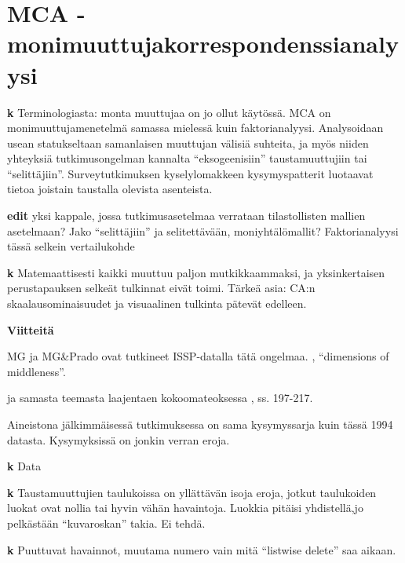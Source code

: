 \documentclass[
  finnish,
]{book}
\begin{document}
\hypertarget{mca---monimuuttujakorrespondenssianalyysi}{%
\section{MCA - monimuuttujakorrespondenssianalyysi}\label{mca---monimuuttujakorrespondenssianalyysi}}

\textbf{k} Terminologiasta: monta muuttujaa on jo ollut käytössä. MCA on monimuuttujamenetelmä
samassa mielessä kuin faktorianalyysi. Analysoidaan usean statukseltaan samanlaisen
muuttujan välisiä suhteita, ja myös niiden yhteyksiä tutkimusongelman kannalta
``eksogeenisiin'' taustamuuttujiin tai ``selittäjiin''. Surveytutkimuksen kyselylomakkeen
kysymyspatterit luotaavat tietoa joistain taustalla olevista asenteista.

\textbf{edit} yksi kappale, jossa tutkimusasetelmaa verrataan tilastollisten mallien
asetelmaan? Jako ``selittäjiin'' ja selitettävään, moniyhtälömallit?
Faktorianalyysi tässä selkein vertailukohde

\textbf{k} Matemaattisesti kaikki muuttuu paljon mutkikkaammaksi, ja yksinkertaisen
perustapauksen selkeät tulkinnat eivät toimi. Tärkeä asia: CA:n skaalausominaisuudet ja
visuaalinen tulkinta pätevät edelleen.

\textbf{Viitteitä}

MG ja MG\&Prado ovat tutkineet ISSP-datalla tätä ongelmaa.
\citep[ , ss.142-]{RefWorks:doc:5a857a43e4b0ed2d44664d7c}, ``dimensions of middleness''.

\citep{RefWorks:doc:5a857a44e4b0ed2d44664d87} ja samasta teemasta laajentaen
kokoomateoksessa \citep{RefWorks:doc:5ab76b43e4b003f4468d1f07}, ss. 197-217.

Aineistona jälkimmäisessä tutkimuksessa on sama kysymyssarja kuin tässä 1994
datasta. Kysymyksissä on jonkin verran eroja.

\textbf{k} Data

\textbf{k} Taustamuuttujien taulukoissa on yllättävän isoja eroja, jotkut taulukoiden luokat
ovat nollia tai hyvin vähän havaintoja. Luokkia pitäisi yhdistellä,jo pelkästään
``kuvaroskan'' takia. Ei tehdä.

\textbf{k} Puuttuvat havainnot, muutama numero vain mitä ``listwise delete'' saa aikaan.
\end{document}
